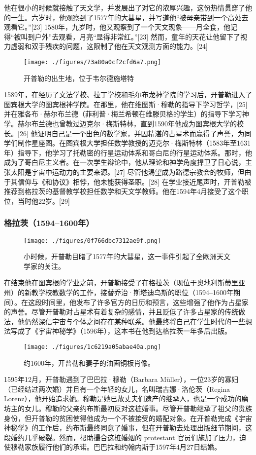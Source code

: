 他在很小的时候就接触了天文学，并发展出了对它的浓厚兴趣，这份热情贯穿了他的一生。六岁时，他观察到了1577年的大彗星，并写道他“被母亲带到一个高处去观看它。”[23] 1580年，九岁时，他又观察到了一个天文现象——月全食，他记得“被叫到户外”去观看，月亮“显得非常红。”[23] 然而，童年的天花让他留下了视力虚弱和双手残疾的问题，这限制了他在天文观测方面的能力。[24]
\begin{figure}[ht]
\centering
\texttt{[image: ./figures/73a80a0cf2cfd6a7.png]}
\caption{开普勒的出生地，位于韦尔德施塔特} \label{fig_KPL1_1}
\end{figure}
1589年，在经历了文法学校、拉丁学校和毛尔布龙神学院的学习后，开普勒进入了图宾根大学的图宾根神学院。在那里，他在维图斯·穆勒的指导下学习哲学，[25] 并在雅各布·赫尔布兰德（菲利普·梅兰希顿在维滕贝格的学生）的指导下学习神学。赫尔布兰德也曾教过迈克尔·梅斯特林，直到1590年他成为图宾根大学的校长。[26] 他证明自己是一个出色的数学家，并因精湛的占星术而赢得了声誉，为同学们制作星座图。在图宾根大学担任数学教授的迈克尔·梅斯特林（1583年至1631年）指导下，他学习了托勒密的行星运动体系和哥白尼的行星运动体系。那时，他成为了哥白尼主义者。在一次学生辩论中，他从理论和神学角度捍卫了日心说，主张太阳是宇宙中运动力的主要来源。[27] 尽管他渴望成为路德宗教会的牧师，但由于其信仰与《和协议》相悖，他未能获得圣职。[28] 在学业接近尾声时，开普勒被推荐到格拉茨的基督教学校担任数学和天文学教师。他在1594年4月接受了这个职位，当时他22岁。[29]
\subsubsection{格拉茨（1594–1600年）}
\begin{figure}[ht]
\centering
\texttt{[image: ./figures/0f766dbc7312ae9f.png]}
\caption{小时候，开普勒目睹了1577年的大彗星，这一事件引起了全欧洲天文学家的关注。} \label{fig_KPL1_3}
\end{figure}
在结束他在图宾根的学业之前，开普勒接受了在格拉茨（现位于奥地利斯蒂里亚州）的新教学校教数学的工作，接替乔治·斯塔迪乌斯的职位（1594–1600年期间）。在这段时间里，他发布了许多官方的日历和预言，这些增强了他作为占星家的声誉。尽管开普勒对占星术有着复杂的感情，并且贬低了许多占星家的传统做法，他仍然深信宇宙与个体之间存在某种联系。他最终将自己在学生时代的一些想法写成了《宇宙神秘学》（1596年），这本书在他到达格拉茨一年多后出版。
\begin{figure}[ht]
\centering
\texttt{[image: ./figures/1c6219a05abae40a.png]}
\caption{约1600年，开普勒和妻子的油画铜板肖像。} \label{fig_KPL1_4}
\end{figure}
1595年12月，开普勒遇到了巴巴拉·穆勒（Barbara Müller），一位23岁的寡妇（已经结过两次婚）并且有一个年轻的女儿，名叫瑞吉娜·洛伦茨（Regina Lorenz），他开始追求她。穆勒是她已故丈夫们遗产的继承人，也是一个成功的磨坊主的女儿。穆勒的父亲约布斯最初反对这桩婚事。尽管开普勒继承了祖父的贵族身份，但开普勒的贫困使得他成为一个不被接受的婚配对象。在开普勒完成《宇宙神秘学》的工作后，约布斯最终同意了婚事，但在开普勒去处理出版细节期间，这段婚约几乎破裂。然而，帮助撮合这桩婚姻的 protestant 官员们施加了压力，迫使穆勒家族履行他们的承诺。巴巴拉和约翰内斯于1597年4月27日结婚。

